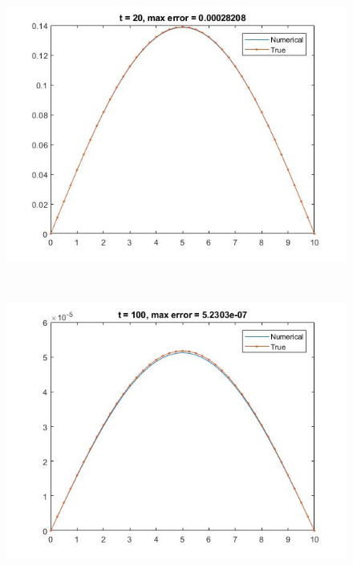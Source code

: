 \begin{figure}
\begin{minipage}{0.5\textwidth}
\end{minipage}
\begin{minipage}{0.5\textwidth}
\includegraphics[width = \textwidth]{15.jpg}
\end{minipage} \\
\begin{minipage}{0.5\textwidth}
\includegraphics[width = \textwidth]{16.jpg}
\end{minipage}
\begin{minipage}{0.5\textwidth}

\end{minipage}
\end{figure}
